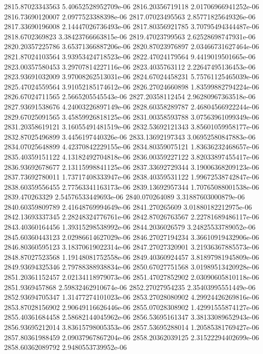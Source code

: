 {2815.87023343563 5.40652528952709e-06
2816.20356719118 2.01706966941252e-06
2816.73690120007 2.0977523388398e-06
2817.07023495563 2.85771825649326e-06
2817.33690196008 2.14447026736493e-06
2817.80356921785 3.70795494344487e-06
2818.6702369823 3.38423766663815e-06
2819.47023799563 2.62528698747931e-06
2820.20357225786 3.65371366887206e-06
2820.87023976897 2.03466731627464e-06
2821.87024103564 3.93953424718523e-06
2822.47024179564 9.4419019501665e-06
2823.00357580453 3.29707814227116e-06
2823.4035763112 2.22647495136453e-06
2823.93691032009 3.97008262513031e-06
2824.67024458231 5.75761125465039e-06
2825.47024559564 3.91052185174612e-06
2826.27024660898 1.83599882794224e-06
2826.67024711565 2.5665205545543e-06
2827.20358112454 2.96280967363518e-06
2827.93691538676 4.24003226897149e-06
2828.60358289787 2.46804566922244e-06
2829.67025091565 3.45859926818125e-06
2831.00358593788 3.07563961099349e-06
2831.20358619121 3.16055491481519e-06
2832.53692121343 3.85601059958177e-06
2832.87025496899 3.4456197440326e-06
2833.13692197343 3.06952580847883e-06
2834.07025648899 4.42370842229155e-06
2834.80359075121 1.83636232468657e-06
2835.40359151122 4.13182492704818e-06
2836.00359227122 3.82033897455417e-06
2836.93692678677 2.13115998841125e-06
2837.33692729344 3.19006368209123e-06
2837.73692780011 1.73717408333947e-06
2838.40359531122 1.99672538742847e-06
2838.60359556455 2.77563341163173e-06
2839.13692957344 1.70765088001538e-06
2839.470263329 2.54576533449693e-06
2840.070264089 3.31887603000879e-06
2840.60359809789 2.41648769994649e-06
2841.270265609 3.01880182212975e-06
2842.13693337345 2.28248324776761e-06
2842.87026763567 2.22781689486117e-06
2843.40360164456 1.39315298538992e-06
2844.2036026579 3.24825533789052e-06
2845.60360443123 2.02986614627029e-06
2846.27027194234 3.36610919432906e-06
2846.80360595123 3.18370619022314e-06
2847.27027320901 3.21936367885573e-06
2848.87027523568 1.19148081752558e-06
2849.40360924457 3.81897981945809e-06
2849.93694325346 2.79788388938834e-06
2850.67027751568 3.01989513420928e-06
2851.20361152457 2.02134118979073e-06
2851.47027852902 2.03090605810118e-06
2851.9369457868 2.59832462910674e-06
2852.27027954235 2.35403995551449e-06
2852.93694705347 1.31477274101023e-06
2853.27028080902 4.29924426269816e-06
2853.87028156902 2.90649116626446e-06
2855.07028308902 1.42991555874127e-06
2855.40361684458 2.58682144045962e-06
2856.53695161347 3.38133089652943e-06
2856.93695212014 3.83615798005353e-06
2857.53695288014 1.20585381769427e-06
2857.80361988459 2.09037967867204e-06
2858.20362039125 2.31522294402699e-06
2858.60362089792 2.9480553739952e-06
}
